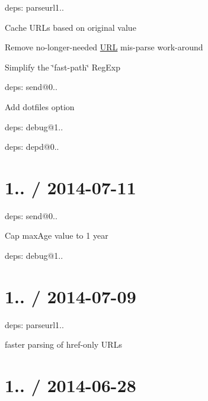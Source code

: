 \begin{DoxyItemize}
\item deps\+: parseurl1..
\begin{DoxyItemize}
\item Cache U\+R\+Ls based on original value
\item Remove no-\/longer-\/needed \mbox{\hyperlink{namespace_u_r_l}{U\+RL}} mis-\/parse work-\/around
\item Simplify the \char`\"{}fast-\/path\char`\"{} {\ttfamily Reg\+Exp}
\end{DoxyItemize}
\item deps\+: send@0..
\begin{DoxyItemize}
\item Add {\ttfamily dotfiles} option
\item deps\+: debug@1..
\item deps\+: depd@0..
\end{DoxyItemize}
\end{DoxyItemize}

\section*{1.. / 2014-\/07-\/11 }


\begin{DoxyItemize}
\item deps\+: send@0..
\begin{DoxyItemize}
\item Cap {\ttfamily max\+Age} value to 1 year
\item deps\+: debug@1..
\end{DoxyItemize}
\end{DoxyItemize}

\section*{1.. / 2014-\/07-\/09 }


\begin{DoxyItemize}
\item deps\+: parseurl1..
\begin{DoxyItemize}
\item faster parsing of href-\/only U\+R\+Ls
\end{DoxyItemize}
\end{DoxyItemize}

\section*{1.. / 2014-\/06-\/28 }


